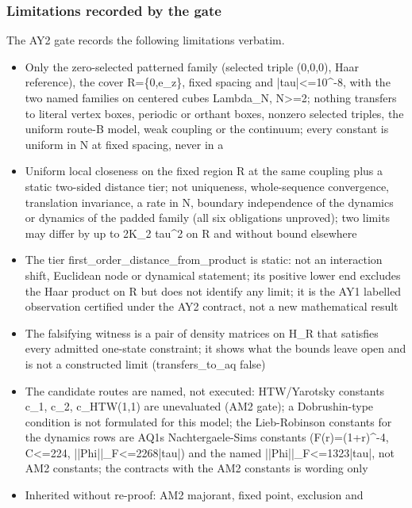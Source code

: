 \subsubsection{Limitations recorded by the gate}
\label{sec:ay2-limits}
The AY2 gate records the following limitations verbatim.
\begin{gatequote}
\begin{itemize}
\item Only the zero-selected patterned family (selected triple (0,0,0), Haar
reference), the cover R=\{0,e\_z\}, fixed spacing and
|tau|<=10\textasciicircum{}-8, with the two named families on centered cubes
Lambda\_N, N>=2; nothing transfers to literal vertex boxes, periodic or
orthant boxes, nonzero selected triples, the uniform route-B model, weak
coupling or the continuum; every constant is uniform in N at fixed spacing,
never in a
\item Uniform local closeness on the fixed region R at the same coupling plus
a static two-sided distance tier; not uniqueness, whole-sequence convergence,
translation invariance, a rate in N, boundary independence of the dynamics or
dynamics of the padded family (all six obligations unproved); two limits may
differ by up to 2K\_2\textquotesingle{} tau\textasciicircum{}2 on R and
without bound elsewhere
\item The tier first\_order\_distance\_from\_product is static: not an
interaction shift, Euclidean node or dynamical statement; its positive lower
end excludes the Haar product on R but does not identify any limit; it is the
AY1 labelled observation certified under the AY2 contract, not a new
mathematical result
\item The falsifying witness is a pair of density matrices on H\_R that
satisfies every admitted one-state constraint; it shows what the bounds leave
open and is not a constructed limit (transfers\_to\_aq false)
\item The candidate routes are named, not executed: HTW/Yarotsky constants
c\_1, c\_2, c\_HTW(1,1) are unevaluated (AM2 gate); a Dobrushin-type condition
is not formulated for this model; the Lieb-Robinson constants for the dynamics
rows are AQ1\textquotesingle{}s Nachtergaele-Sims constants
(F(r)=(1+r)\textasciicircum{}-4, C<=224, ||Phi||\_F<=2268|tau|) and the named
||Phi\textquotesingle{}||\_F<=1323|tau|, not AM2 constants; the
contract\textquotesingle{}s \textquotesingle{}with the AM2
constants\textquotesingle{} is wording only
\item Inherited without re-proof: AM2 majorant, fixed point, exclusion and

\end{itemize}
\end{gatequote}
